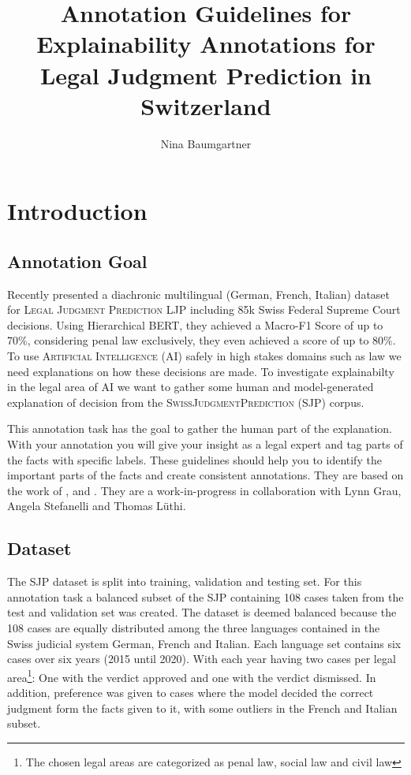 \documentclass{article}
\title{Annotation Guidelines for Explainability Annotations for Legal Judgment Prediction in Switzerland}
\author{Nina Baumgartner}
\date{} %
\begin{document}
\maketitle
\section{Introduction}
\subsection{Annotation Goal}
Recently  \citet{Niklaus_2021} presented a diachronic multilingual (German, French, Italian) dataset for \textsc{Legal Judgment Prediction} LJP including 85k Swiss Federal Supreme Court decisions. Using Hierarchical BERT, they achieved a Macro-F1 Score of up to 70\%, considering penal law exclusively, they even achieved a score of up to 80\%. To use \textsc{Artificial Intelligence} (AI) safely in high stakes domains such as law we need explanations on how these decisions are made. To investigate explainabilty in the legal area of AI we want to gather some human and model-generated explanation of decision from the \textsc{SwissJudgmentPrediction} (SJP) corpus.

This annotation task has the goal to gather the human part of the explanation. With your annotation you will give your insight as a legal expert and tag parts of the facts with specific labels. These guidelines should help you to identify the important parts of the facts and create consistent annotations. They are based on the work of \cite{Reiter+2020+193+202}, \cite{Leitner_2019} and \cite{pustejovsky2012natural}. They are a work-in-progress in collaboration with Lynn Grau, Angela Stefanelli and Thomas Lüthi.

\subsection{Dataset}
The SJP dataset is split into training, validation and testing set. For this annotation task a balanced subset of the SJP containing 108 cases taken from the test and validation set was created. The dataset is deemed balanced because the 108 cases are equally distributed among the three languages contained in the Swiss judicial system German, French and Italian. Each language set contains six cases over six years (2015 until 2020). With each year having two cases per legal area\footnote{The chosen legal areas are categorized as penal law, social law and civil law}: One with the verdict approved and one with the verdict dismissed. In addition, preference was given to cases where the model decided the correct judgment form the facts given to it, with some outliers in the French and Italian subset.
\end{document}
